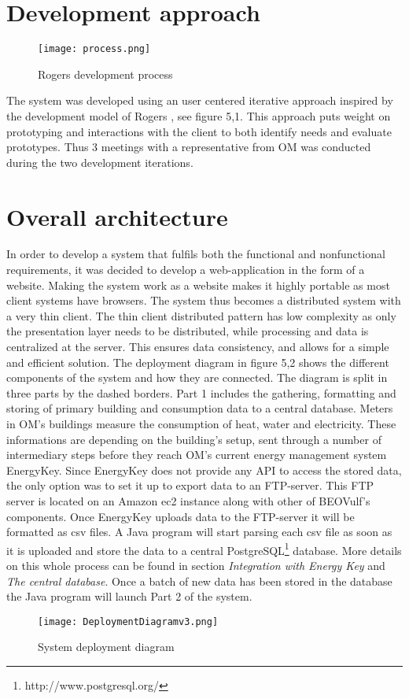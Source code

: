 \section{Development approach}
\begin{figure}
\begin{center}
\texttt{[image: process.png]}
\end{center}
\caption{Rogers development process}
\end{figure}
The system was developed using an user centered iterative approach inspired by the development model of Rogers \cite{interaction}, see figure 5,1. This approach puts weight on prototyping and interactions with the client to both identify needs and evaluate prototypes. Thus 3 meetings with a representative from OM was conducted during the two development iterations.
\section{Overall architecture}
In order to develop a system that fulfils both the functional and nonfunctional requirements, it was decided to develop a web-application in the form of a website. Making the system work as a website makes it highly portable as most client systems have browsers. The system thus becomes a distributed system with a very thin client. The thin client distributed pattern has low complexity as only the presentation layer needs to be distributed, while processing and data is centralized at the server. This ensures data consistency, and allows for a simple and efficient solution. The deployment diagram in figure 5,2 shows the different components of the system and how they are connected. The diagram is split in three parts by the dashed borders. 
Part 1 includes the gathering, formatting and storing of primary building and consumption data to a central database. Meters in OM’s buildings measure the consumption of heat, water and electricity. These informations are depending on the building’s setup, sent through a number of intermediary steps before they reach OM’s current energy management system EnergyKey. Since EnergyKey does not provide any API to access the stored data, the only option was to set it up to export data to an FTP-server. This FTP server is located on an Amazon ec2 instance along with other of BEOVulf’s components. Once EnergyKey uploads data to the FTP-server it will be formatted as csv files. A Java program will start parsing each csv file as soon as it is uploaded and store the data to a central PostgreSQL\footnote{http://www.postgresql.org/} database. More details on this whole process can be found in section \emph{Integration with Energy Key} and \emph{The central database}. Once a batch of new data has been stored in the database the Java program will launch Part 2 of the system.
\begin{figure}
\begin{center}
\texttt{[image: DeploymentDiagramv3.png]}
\end{center}
\caption{System deployment diagram}
\end{figure}

